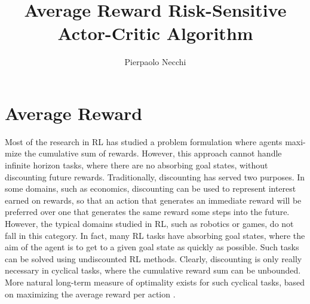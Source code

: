 \documentclass[a4paper,11pt]{article}
\begin{document}
\title{Average Reward Risk-Sensitive Actor-Critic Algorithm}
\author{Pierpaolo Necchi}
\maketitle

\section{Average Reward}
Most of the research in RL has studied a problem formulation where agents maxi-
mize the cumulative sum of rewards. However, this approach cannot handle 
infinite horizon tasks, where there are no absorbing goal states, without
discounting future rewards. Traditionally, discounting has served two purposes.
In some domains, such as economics, discounting can be used to represent
interest earned on rewards, so that an action that generates an immediate
reward will be preferred over one that generates the same reward some steps
into the future. However, the typical domains studied in RL, such as robotics
or games, do not fall in this category. In fact, many RL tasks have absorbing
goal states, where the aim of the agent is to get to a given goal state as
quickly as possible. Such tasks can be solved using undiscounted RL methods.  
Clearly, discounting is only really necessary in cyclical tasks, where the 
cumulative reward sum can be unbounded. More natural long-term measure of
optimality exists for such cyclical tasks, based on maximizing the average
reward per action \cite{mahadevan1996average}. 
\end{document}
